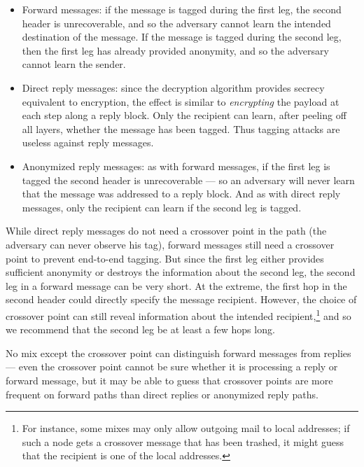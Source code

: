 \documentclass[11pt]{IEEEtran}
\begin{document}
\begin{itemize}
\item Forward messages: if the message is tagged during the first leg,
the second header is unrecoverable, and so the adversary cannot
learn the intended destination of the message. If the message is tagged
during the second leg, then the first leg has already provided anonymity,
and so the adversary cannot learn the sender.
\item Direct reply messages: since the decryption algorithm provides
secrecy equivalent to encryption, the effect is similar to {\em encrypting}
the payload at each step along a reply block. Only the recipient can learn,
after peeling off all layers, whether the message has been tagged. Thus
tagging attacks are useless against reply messages.
\item Anonymized reply messages: as with forward messages, if the first leg
is tagged the second header is unrecoverable --- so an adversary will
never learn that the message was addressed to a reply block. And as with
direct reply messages, only the recipient can learn if the second leg is
tagged.
\end{itemize}

While direct reply messages do not need a crossover point in the path
(the adversary can never observe his tag), forward messages still need a
crossover point to prevent end-to-end tagging. But since the first leg
either provides sufficient anonymity or destroys the information about
the second leg, the second leg in a forward message can be very short.
At the extreme, the first hop in the second header could directly
specify the message recipient. However, the choice of crossover point
can still reveal information about the intended recipient,\footnote{For instance,
some mixes may only allow outgoing mail to local addresses; if such a
node gets a crossover message that has been trashed, it might guess
that the recipient is one of the local addresses.} and so we recommend
that the second leg be at least a few hops long.

No mix except the crossover point can distinguish forward messages from
replies --- even the crossover point cannot be sure whether it is processing
a reply or forward message, but it may be able to guess that crossover
points are more frequent on forward paths than direct replies or
anonymized reply paths.
\end{document}

